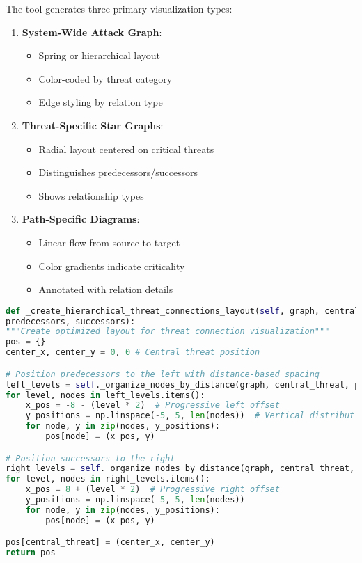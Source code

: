 \documentclass[binding=0.6cm]{sapthesis}
\begin{document}
The tool generates three primary visualization types:

\begin{enumerate}
\item \textbf{System-Wide Attack Graph}:
\begin{itemize}
\item Spring or hierarchical layout
\item Color-coded by threat category
\item Edge styling by relation type
\end{itemize}

\item \textbf{Threat-Specific Star Graphs}:
\begin{itemize}
    \item Radial layout centered on critical threats
    \item Distinguishes predecessors/successors
    \item Shows relationship types
\end{itemize}

\item \textbf{Path-Specific Diagrams}:
\begin{itemize}
    \item Linear flow from source to target
    \item Color gradients indicate criticality
    \item Annotated with relation details
\end{itemize}
\end{enumerate}

\begin{lstlisting}[language=Python, caption=Visualization Configuration]
def _create_hierarchical_threat_connections_layout(self, graph, central_threat,
predecessors, successors):
"""Create optimized layout for threat connection visualization"""
pos = {}
center_x, center_y = 0, 0 # Central threat position

# Position predecessors to the left with distance-based spacing
left_levels = self._organize_nodes_by_distance(graph, central_threat, predecessors, reverse=True)
for level, nodes in left_levels.items():
    x_pos = -8 - (level * 2)  # Progressive left offset
    y_positions = np.linspace(-5, 5, len(nodes))  # Vertical distribution
    for node, y in zip(nodes, y_positions):
        pos[node] = (x_pos, y)

# Position successors to the right 
right_levels = self._organize_nodes_by_distance(graph, central_threat, successors, reverse=False)
for level, nodes in right_levels.items():
    x_pos = 8 + (level * 2)  # Progressive right offset
    y_positions = np.linspace(-5, 5, len(nodes))
    for node, y in zip(nodes, y_positions):
        pos[node] = (x_pos, y)

pos[central_threat] = (center_x, center_y)
return pos
\end{lstlisting}
\end{document}
